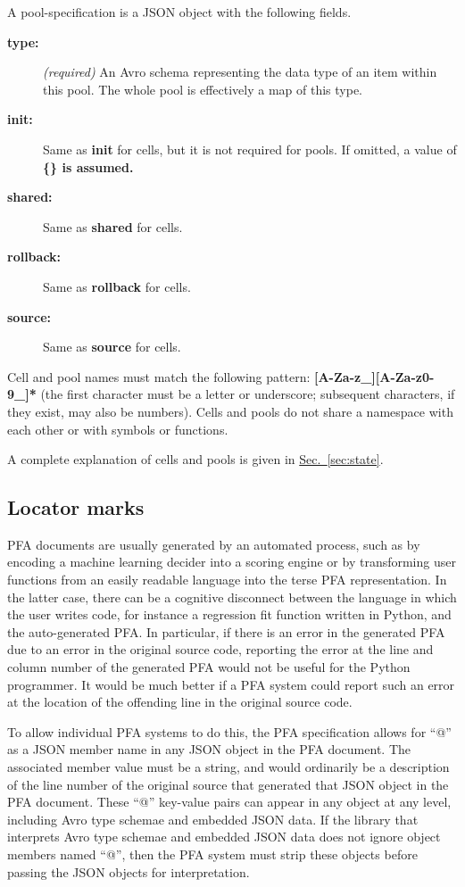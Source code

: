 \documentclass{article}
\newcommand{\PFAc}{\ttfamily\bfseries}
\newenvironment{allowedfields}%
  {\begin{center} \begin{minipage}{0.9\linewidth} \begin{description}}%
  {\end{description} \end{minipage} \end{center}}
\theoremstyle{definition}
\begin{document}
A pool-specification is a JSON object with the following fields.
\begin{allowedfields}
\item[\PFAc type:] {\it (required)} An Avro schema representing the data type of an item within this pool. The whole pool is effectively a map of this type.
\item[\PFAc init:] Same as {\PFAc init} for cells, but it is not required for pools. If omitted, a value of \PFAc{\{\}} is assumed.
\item[\PFAc shared:] Same as {\PFAc shared} for cells.
\item[\PFAc rollback:] Same as {\PFAc rollback} for cells.
\item[\PFAc source:] Same as {\PFAc source} for cells.
\end{allowedfields}

Cell and pool names must match the following pattern: {\PFAc [A-Za-z\_][A-Za-z0-9\_]*} (the first character must be a letter or underscore; subsequent characters, if they exist, may also be numbers).  Cells and pools do not share a namespace with each other or with symbols or functions.

A complete explanation of cells and pools is given in \hyperlink{hsec:state}{Sec.~\ref{sec:state}}.

\subsection{Locator marks}

PFA documents are usually generated by an automated process, such as by encoding a machine learning decider into a scoring engine or by transforming user functions from an easily readable language into the terse PFA representation.  In the latter case, there can be a cognitive disconnect between the language in which the user writes code, for instance a regression fit function written in Python, and the auto-generated PFA.  In particular, if there is an error in the generated PFA due to an error in the original source code, reporting the error at the line and column number of the generated PFA would not be useful for the Python programmer.  It would be much better if a PFA system could report such an error at the location of the offending line in the original source code.

To allow individual PFA systems to do this, the PFA specification allows for ``@'' as a JSON member name in any JSON object in the PFA document.  The associated member value must be a string, and would ordinarily be a description of the line number of the original source that generated that JSON object in the PFA document.  These ``@'' key-value pairs can appear in any object at any level, including Avro type schemae and embedded JSON data.  If the library that interprets Avro type schemae and embedded JSON data does not ignore object members named ``@'', then the PFA system must strip these objects before passing the JSON objects for interpretation.
\end{document}

